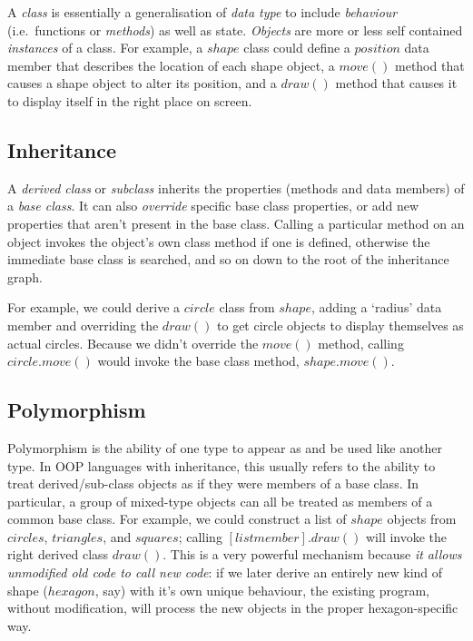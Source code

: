 \documentclass[11pt,a4paper]{article}
\begin{document}
A {\em class} is essentially a generalisation of {\em data type} to
include {\em behaviour} (i.e.\ functions or {\em methods}) as well as
state.  {\em Objects} are more or less self contained {\em instances} of
a class. For example, a $shape$ class could define a $position$ data
member that describes the location of each shape object, a $move()$
method that causes a shape object to alter its position, and a $draw()$
method that causes it to display itself in the right place on screen.

\subsection{Inheritance}

A {\em derived class} or {\em subclass} inherits the properties (methods
and data members) of a {\em base class}. It can also {\em override}
specific base class properties, or add new properties that aren't
present in the base class. Calling a particular method on an object
invokes the object's own class method if one is defined, otherwise the
immediate base class is searched, and so on down to the root of the
inheritance graph. 

For example, we could derive a $circle$ class from $shape$, adding a
`radius' data member and overriding the $draw()$ to get circle objects
to display themselves as actual circles.  Because we didn't override the
$move()$ method, calling $circle.move()$ would invoke the base class
method, $shape.move()$. 


\subsection{Polymorphism}

Polymorphism is the ability of one type to appear as and be used like
another type.  In OOP languages with inheritance, this usually refers to
the ability to treat derived/sub-class objects as if they were members
of a base class.  In particular, a group of mixed-type objects can all
be treated as members of a common base class. For example, we could
construct a list of $shape$ objects from $circles$, $triangles$, and
$squares$; calling $[list member].draw()$ will invoke the right derived
class $draw()$. This is a very powerful mechanism because {\em it allows
unmodified old code to call new code}: if we later derive an entirely
new kind of shape ($hexagon$, say) with it's own unique behaviour, the
existing program, without modification, will process the new objects in
the proper hexagon-specific way.
\end{document}
